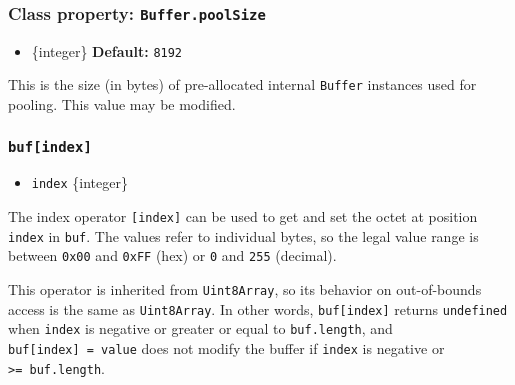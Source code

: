 \subsubsection{\texorpdfstring{Class property:
\texttt{Buffer.poolSize}}{Class property: Buffer.poolSize}}\label{class-property-buffer.poolsize}

\begin{itemize}
\tightlist
\item
  \{integer\} \textbf{Default:} \texttt{8192}
\end{itemize}

This is the size (in bytes) of pre-allocated internal \texttt{Buffer}
instances used for pooling. This value may be modified.

\subsubsection{\texorpdfstring{\texttt{buf{[}index{]}}}{buf{[}index{]}}}\label{bufindex}

\begin{itemize}
\tightlist
\item
  \texttt{index} \{integer\}
\end{itemize}

The index operator \texttt{{[}index{]}} can be used to get and set the
octet at position \texttt{index} in \texttt{buf}. The values refer to
individual bytes, so the legal value range is between \texttt{0x00} and
\texttt{0xFF} (hex) or \texttt{0} and \texttt{255} (decimal).

This operator is inherited from \texttt{Uint8Array}, so its behavior on
out-of-bounds access is the same as \texttt{Uint8Array}. In other words,
\texttt{buf{[}index{]}} returns \texttt{undefined} when \texttt{index}
is negative or greater or equal to \texttt{buf.length}, and
\texttt{buf{[}index{]}\ =\ value} does not modify the buffer if
\texttt{index} is negative or \texttt{\textgreater{}=\ buf.length}.

